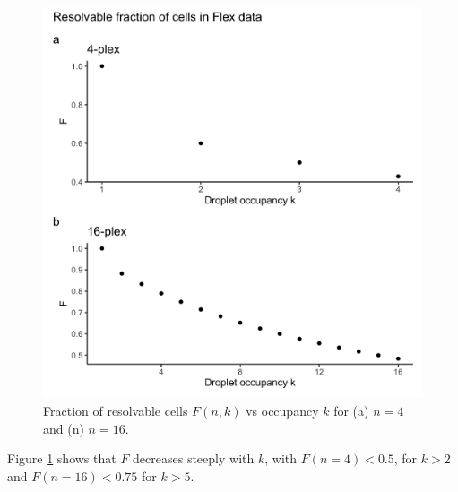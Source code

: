 \documentclass[unnumsec,webpdf,modern,large]{oup-authoring-template}
\begin{document}
	\begin{figure}
		\begin{center}
			\includegraphics[scale=0.1]{figures/observable_fraction_GEM_occupancy.png}
			\caption{Fraction of resolvable cells $F(n, k)$ vs occupancy $k$ for (a) $n = 4$ and (n) $n = 16$.
			}		
			\label{fig:resolvable_fraction}
		\end{center}
	\end{figure}
	Figure \ref{fig:resolvable_fraction} shows that $F$ decreases steeply with $k$, with $F(n = 4) < 0.5$,  for $k > 2$ and $F(n = 16) < 0.75$ for $k > 5$.
	
\end{document}
